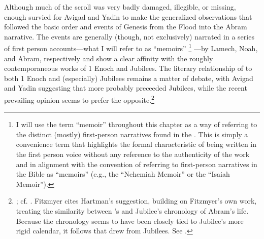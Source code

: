 Although much of the scroll was very badly damaged, illegible, or missing, enough survied for Avigad and Yadin to make the generalized observations that \ga followed the basic order and events of Genesis from the Flood into the Abram narrative. The events are generally (though, not exclusively) narrated in a series of first person accounts---what I will refer to as ``memoirs''%
%
\footnote{I will use the term ``memoir'' throughout this chapter as a way of referring to the distinct (mostly) first-person narratives found in the \ga. This is simply a convenience term that highlights the formal characteristic of being written in the first person voice without any reference to the authenticity of the work and in alignment with the convention of referring to first-person narratives in the Bible as ``memoirs'' (e.g., the ``Nehemiah Memoir'' or the ``Isaiah Memoir'').}%
---by Lamech, Noah, and Abram, respectively and show a clear affinity with the roughly contemporaneous works of 1 Enoch and Jubilees.\autocite[16--37]{avigad-yadin1956} The literary relationship of \ga to both 1 Enoch and (especially) Jubilees remains a matter of debate, with Avigad and Yadin suggesting that \ga more probably preceeded Jubilees, while the recent prevailing opinion seems to prefer the opposite.\footnote{\cite[38]{avigad-yadin1956}; cf. \cite[20--21]{fitzmyer2004}. Fitzmyer cites Hartman's suggestion, building on Fitzmyer's own work, treating the similarity between \ga's and Jubilee's chronology of Abram's life. Because the chronology seems to have been closely tied to Jubilee's more rigid calendar, it follows that \ga drew from Jubilees. See \cite[497]{hartman_cbq1966}.}

